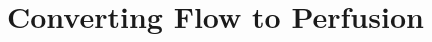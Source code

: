\documentclass[paper=a4, fontsize=12pt,parskip=half,draft,headings=small]{scrartcl}
\begin{document}
	
	
	
	\section{Converting Flow to Perfusion}\label{sec:flow2perf}
	
	
	
	
	
	
	
	 
	
	
	
	
	
	


		
	

	
\end{document}

